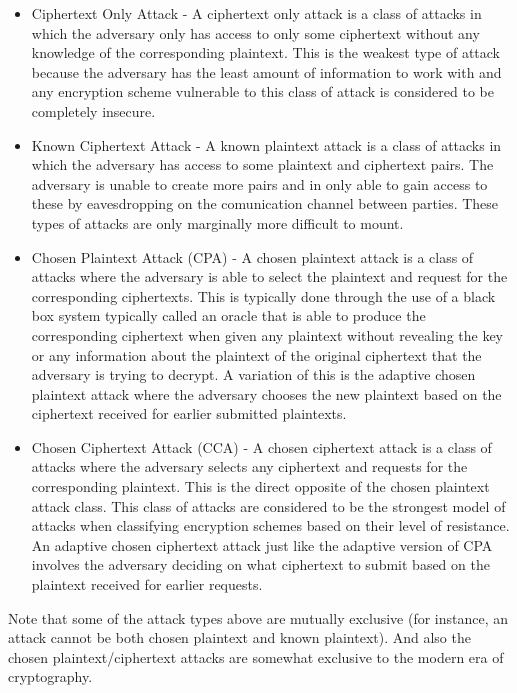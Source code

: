 \begin{itemize}
	\item Ciphertext Only Attack \cite{Menezes1996} - A ciphertext only attack is a class of attacks in which the adversary only has access to only some ciphertext without any knowledge of the corresponding plaintext. This is the weakest type of attack because the adversary has the least amount of information to work with and any encryption scheme vulnerable to this class of attack is considered to be completely insecure.
	
	\item Known Ciphertext Attack \cite{Menezes1996} - A known plaintext attack is a class of attacks in which the adversary has access to some plaintext and ciphertext pairs. The  adversary is unable to create more pairs and in only able to gain access to these by eavesdropping on the comunication channel between parties. These types of attacks are only marginally more difficult to mount. 
	
	\item Chosen Plaintext Attack (CPA) \cite{Menezes1996} - A chosen plaintext attack is a class of attacks where the adversary is able to select the plaintext and request for the corresponding ciphertexts. This is typically done through the use of a black box system typically called an oracle that is able to produce the corresponding ciphertext when given any plaintext without revealing the key or any information about the plaintext of the original ciphertext that the adversary is trying to decrypt. A variation of this is the adaptive chosen plaintext attack where the adversary chooses the new plaintext based on the ciphertext received for earlier submitted plaintexts.
	
	\item Chosen Ciphertext Attack (CCA) \cite{Menezes1996} - A chosen ciphertext attack is a class of attacks where the adversary selects any ciphertext and requests for the corresponding plaintext. This is the direct opposite of the chosen plaintext attack class. This class of attacks are considered to be the strongest model of attacks when classifying encryption schemes based on their level of resistance. An adaptive chosen ciphertext attack just like the adaptive version of CPA involves the adversary deciding on what ciphertext to submit based on the plaintext received for earlier requests.
	
\end{itemize}

Note that some of the attack types above are mutually exclusive (for instance, an attack cannot be both chosen plaintext and known plaintext). And also the chosen plaintext/ciphertext attacks are somewhat exclusive to the modern era of cryptography.

